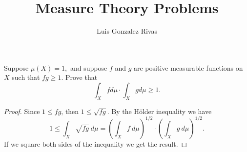 \documentclass[14.5pt]{article}
\title{Measure Theory Problems}
\author{Luis Gonzalez Rivas}
\newenvironment{problem}[2][Problem]{\begin{mdframed}[backgroundcolor=gray!10, leftline = false, rightline=false, linewidth=0.25pt]  \begin{trivlist}
\item[\hskip \labelsep {\bfseries #1}\hskip \labelsep {\bfseries #2.}]}{\end{trivlist} \end{mdframed}  }
\begin{document}
\maketitle

\begin{problem}{1}
Suppose $\mu(X) = 1, $ and suppose $f$ and $g$ are positive measurable functions on $X$ such that $fg \ge 1$. Prove that
$$ \int_X f d\mu \cdot \int_X g d\mu \ge 1.$$    
\end{problem}
\begin{proof}
Since $1 \le fg $, then $1 \le \sqrt{fg}$. By the Hölder inequality we have
$$1 \le \int_X  \sqrt{fg} \ d\mu  = \left(\int_X f\ d\mu\right)^{1/2} \cdot  \left(\int_X g\ d\mu\right)^{1/2}.$$
If we square both sides of the inequality we get the result.
\end{proof}


\end{document}
